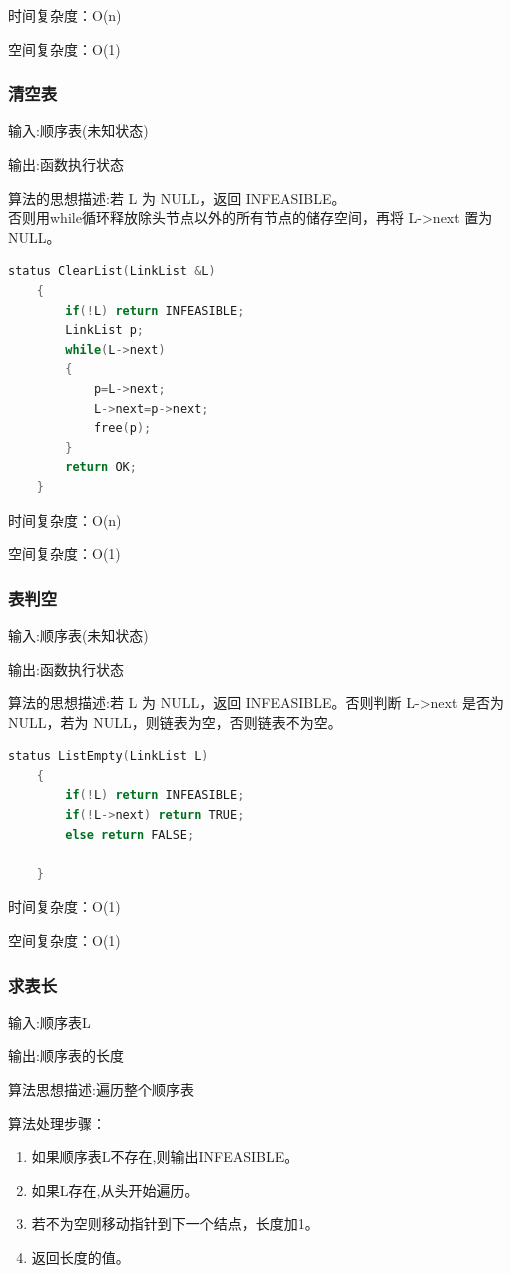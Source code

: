 \documentclass[supercite]{Experimental_Report}
\theoremstyle{definition}
\begin{document}
时间复杂度：O(n)

空间复杂度：O(1)
\subsubsection{清空表}
输入:顺序表(未知状态)

输出:函数执行状态

算法的思想描述:若 L 为 NULL，返回 INFEASIBLE。\\否则用while循环释放除头节点以外的所有节点的储存空间，再将 L->next 置为 NULL。

\begin{lstlisting}[language=C] 
	status ClearList(LinkList &L)
	{
		if(!L) return INFEASIBLE;
		LinkList p;
		while(L->next)
		{
			p=L->next;
			L->next=p->next;
			free(p);
		}
		return OK;
	}
\end{lstlisting}

时间复杂度：O(n)

空间复杂度：O(1)
\subsubsection{表判空}
输入:顺序表(未知状态)

输出:函数执行状态

算法的思想描述:若 L 为 NULL，返回 INFEASIBLE。否则判断 L->next 是否为 NULL，若为 NULL，则链表为空，否则链表不为空。
\begin{lstlisting}[language=C] 
	status ListEmpty(LinkList L)
	{
		if(!L) return INFEASIBLE;
		if(!L->next) return TRUE;
		else return FALSE;
		
	}
\end{lstlisting}

时间复杂度：O(1)

空间复杂度：O(1)
\subsubsection{求表长}

输入:顺序表L

输出:顺序表的长度

算法思想描述:遍历整个顺序表

算法处理步骤：
\begin{enumerate}
	\renewcommand{\labelenumi}{\theenumi)}
	\item 如果顺序表L不存在,则输出INFEASIBLE。
	\item 如果L存在,从头开始遍历。
	\item 若不为空则移动指针到下一个结点，长度加1。
	\item 返回长度的值。
\end{enumerate}
\end{document}
